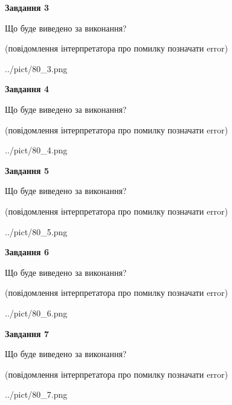 \documentclass[12pt, ukrainian]{article}
\begin{document}
{\begin {large}
{\begin {center}\textbf{Завдання 3}\end {center}}\par
Що буде виведено за виконання?\par
 (повідомлення інтерпретатора про помилку позначати error)\par
\begin{center}
	{../pict/80_3.png}
\end{center}
\newpage

{\begin {center}\textbf{Завдання 4}\end {center}}\par
Що буде виведено за виконання?\par
 (повідомлення інтерпретатора про помилку позначати error)\par
\begin{center}
	{../pict/80_4.png}
\end{center}
\newpage

{\begin {center}\textbf{Завдання 5}\end {center}}\par
Що буде виведено за виконання?\par
 (повідомлення інтерпретатора про помилку позначати error)\par
\begin{center}
	{../pict/80_5.png}
\end{center}
\newpage

{\begin {center}\textbf{Завдання 6}\end {center}}\par
Що буде виведено за виконання?\par
 (повідомлення інтерпретатора про помилку позначати error)\par
\begin{center}
	{../pict/80_6.png}
\end{center}
\newpage

{\begin {center}\textbf{Завдання 7}\end {center}}\par
Що буде виведено за виконання?\par
 (повідомлення інтерпретатора про помилку позначати error)\par
\begin{center}
	{../pict/80_7.png}
\end{center}
\newpage


\end{large}}
\end{document}
